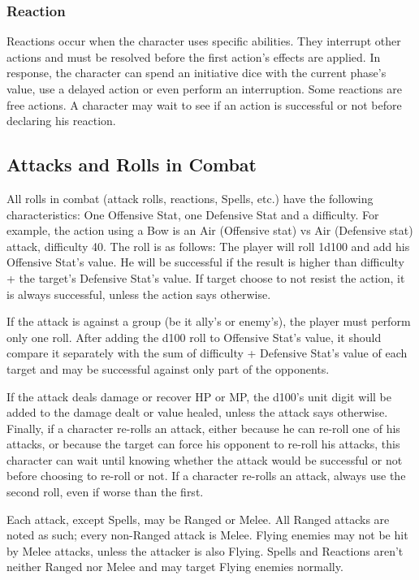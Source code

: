 \begin{multicols}{2}
\subsubsection{Reaction}
Reactions occur when the character uses specific abilities. They interrupt other actions and must be resolved before the first action’s effects are applied. In response, the character can spend an initiative dice with the current phase’s value, use a delayed action or even perform an interruption. Some reactions are free actions. A character may wait to see if an action is successful or not before declaring his reaction.

\subsection{Attacks and Rolls in Combat}\label{subsec:attacks}
All rolls in combat (attack rolls, reactions, Spells, etc.) have the following characteristics: One Offensive Stat, one Defensive Stat and a difficulty. For example, the  action using a Bow is an Air (Offensive stat) vs Air (Defensive stat) attack, difficulty 40. The roll is as follows: The player will roll 1d100 and add his Offensive Stat’s value. He will be successful if the result is higher than difficulty + the target’s Defensive Stat’s value. If target choose to not resist the action, it is always successful, unless the action says otherwise.

If the attack is against a group (be it ally’s or enemy’s), the player must perform only one roll. After adding the d100 roll to Offensive Stat’s value, it should compare it separately with the sum of difficulty + Defensive Stat’s value of each target and may be successful against only part of the opponents.

If the attack deals damage or recover HP or MP, the d100’s unit digit will be added to the damage dealt or value healed, unless the attack says otherwise. Finally, if a character re-rolls an attack, either because he can re-roll one of his attacks, or because the target can force his opponent to re-roll his attacks, this character can wait until knowing whether the attack would be successful or not before choosing to re-roll or not. If a character re-rolls an attack, always use the second roll, even if worse than the first.

Each attack, except Spells, may be Ranged or Melee. All Ranged attacks are noted as such; every non-Ranged attack is Melee. Flying enemies may not be hit by Melee attacks, unless the attacker is also Flying. Spells and Reactions aren't neither Ranged nor Melee and may target Flying enemies normally.


\end{multicols}
